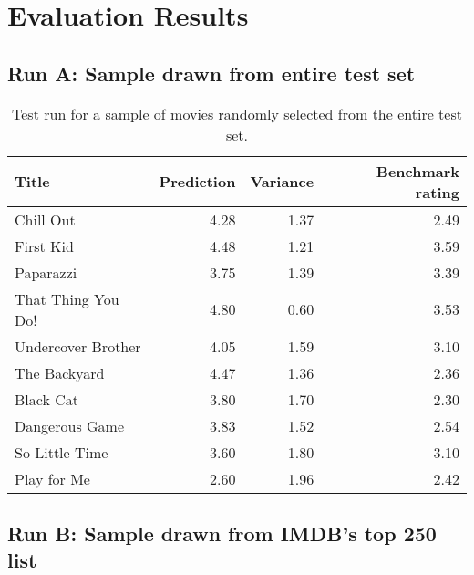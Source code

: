 
\chapter{Evaluation Results} %

\label{AppendixA} %



\section{Run A: Sample drawn from entire test set}

\begin{table}[h]
  \begin{center}
    \begin{tabular}{|l|rr|r|}
      \hline
      \textbf{Title} & \textbf{Prediction} & \textbf{Variance} & \textbf{Benchmark rating} \\
      \hline
      Chill Out          & 4.28 & 1.37 & 2.49 \\
      First Kid          & 4.48 & 1.21 & 3.59 \\
      Paparazzi          & 3.75 & 1.39 & 3.39 \\
      That Thing You Do! & 4.80 & 0.60 & 3.53 \\
      Undercover Brother & 4.05 & 1.59 & 3.10 \\
      The Backyard       & 4.47 & 1.36 & 2.36 \\
      Black Cat          & 3.80 & 1.70 & 2.30 \\
      Dangerous Game     & 3.83 & 1.52 & 2.54 \\
      So Little Time     & 3.60 & 1.80 & 3.10 \\
      Play for Me        & 2.60 & 1.96 & 2.42 \\
      \hline
    \end{tabular}
  \end{center}
  \caption{Test run for a sample of movies randomly selected from the entire test set.}
  \label{tab:test_run_all}
\end{table}


\section{Run B: Sample drawn from IMDB's top 250 list}

